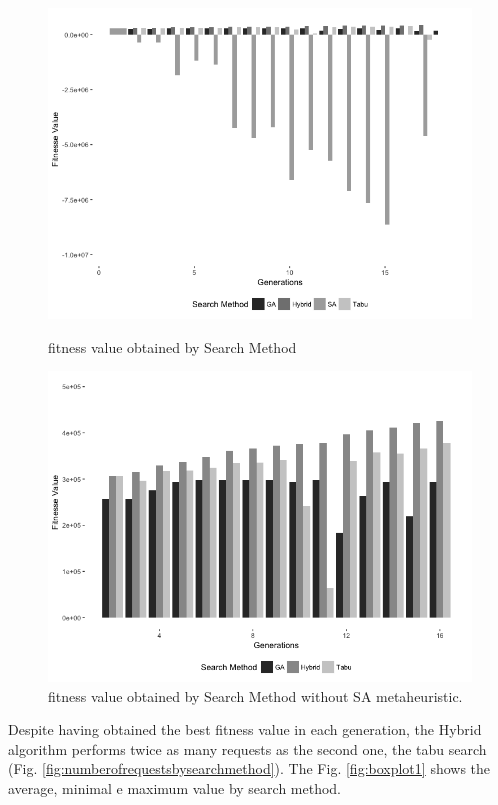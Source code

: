 \begin{figure}[h]
\begin{minipage}{.5\textwidth}
\centering
\includegraphics[width=1\textwidth]{./images/experiment1-1-bw.png}
\caption{fitness value obtained by Search Method }
\label{fig:fitnessbygeneration1}
\end{minipage}
\begin{minipage}{.5\textwidth}
\centering
\includegraphics[width=1\textwidth]{./images/experiment1-2-bw.png}
\caption{fitness value obtained by Search Method without SA metaheuristic.}
\label{fig:fitnessbygeneration1-2}
\end{minipage}
\end{figure}

Despite having obtained the best fitness value in each generation, the Hybrid algorithm performs twice as many requests as the second one, the tabu search (Fig. \ref{fig:numberofrequestsbysearchmethod}). The Fig. \ref{fig:boxplot1} shows the average, minimal e maximum value by search method.


